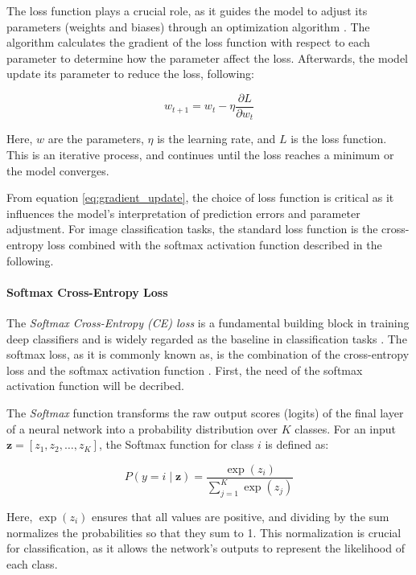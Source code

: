 The loss function plays a crucial role, as it guides the model to adjust its parameters (weights and biases) through an optimization algorithm \cite{Goodfellow-et-al-2016}. The algorithm calculates the gradient of the loss function with respect to each parameter to determine how the parameter affect the loss. Afterwards, the model update its parameter to reduce the loss, following:

\begin{equation}
    \label{eq:gradient_update}
    w_{t+1} = w_t - \eta \frac{\partial L}{\partial w_t}
\end{equation}

Here, $w$ are the parameters, $\eta$ is the learning rate, and $L$ is the loss function. This is an iterative process, and continues until the loss reaches a minimum or the model converges.

From equation \eqref{eq:gradient_update}, the choice of loss function is critical as it influences the model's interpretation of prediction errors and parameter adjustment. For image classification tasks, the standard loss function is the cross-entropy loss combined with the softmax activation function \cite{zhang2023dive} described in the following.

\paragraph{Softmax Cross-Entropy Loss}
The \emph{Softmax Cross-Entropy (CE) loss} is a fundamental building block in training deep classifiers and is widely regarded as the baseline in classification tasks \cite{zhang2023deep, cs231n, pytorch_crossentropy}. The softmax loss, as it is commonly known as, is the combination of the cross-entropy loss and the softmax activation function \cite{zhang2023dive,Goodfellow-et-al-2016}. First, the need of the softmax activation function will be decribed.

The \textit{Softmax} function transforms the raw output scores (logits) of the final layer of a neural network into a probability distribution over \( K \) classes. For an input \( \mathbf{z} = [z_1, z_2, \dots, z_K] \), the Softmax function for class \( i \) is defined as:

\begin{equation}
    P(y = i \mid \mathbf{z}) = \frac{\exp(z_i)}{\sum_{j=1}^{K} \exp(z_j)}
\end{equation}

Here, \( \exp(z_i) \) ensures that all values are positive, and dividing by the sum normalizes the probabilities so that they sum to 1. This normalization is crucial for classification, as it allows the network's outputs to represent the likelihood of each class.

